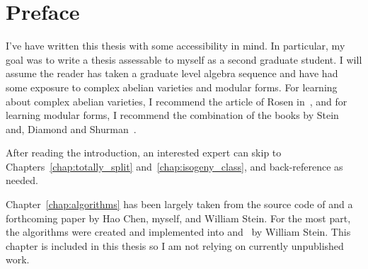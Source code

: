 \documentclass[11pt, proquest]{uwthesis}
\begin{document}
\prelimpages



\copyrightpage

\titlepage
\tableofcontents
\listoffigures


\textpages


\chapter*{Preface}

I've have written this thesis with some accessibility in mind. In particular,
my goal was to write a thesis assessable to myself as a second graduate
student. I will assume the reader has taken a graduate level algebra sequence
and have had some exposure to complex abelian varieties and modular forms. For
learning about complex abelian varieties, I recommend the article of Rosen
in~\cite{mr89b:14029}, and for learning modular forms, I recommend the
combination of the books by Stein~\cite{stein:modform} and, Diamond and
Shurman~\cite{diamond-shurman}.

After reading the introduction, an interested expert can skip to
Chapters~\ref{chap:totally_split} and~\ref{chap:isogeny_class}, and
back-reference as needed.

Chapter~\ref{chap:algorithms} has been largely taken from the source code of
\sage and a forthcoming paper by Hao Chen, myself, and William Stein. For the
most part, the algorithms were created and implemented into \sage and \magma~by
William Stein. This chapter is included in this thesis so I am not relying on
currently unpublished work.
\end{document}
